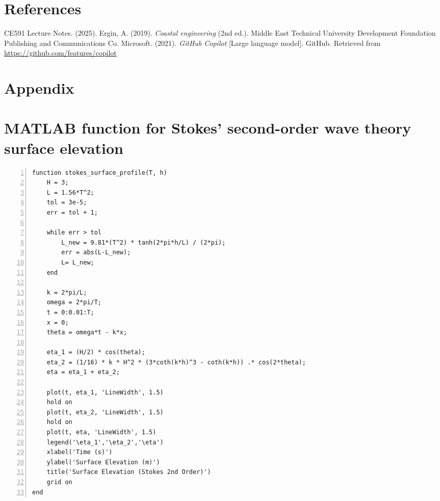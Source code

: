 \documentclass[a4paper]{article}
\begin{document}
\newpage
\renewcommand{\refname}{}
\section{References}
\vspace{-1cm}
\begin{thebibliography}{99}
     CE591 Lecture Notes. (2025). 
     Ergin, A. (2019). \textit{Coastal engineering} (2nd ed.). Middle East Technical University Development Foundation Publishing and Communications Co.
     Microsoft. (2021). \textit{GitHub Copilot} [Large language model]. GitHub. Retrieved from \url{https://github.com/features/copilot}
\end{thebibliography}

\newpage
\appendix

\section{Appendix}

\section*{\small MATLAB function for Stokes' second-order wave theory surface elevation}
\begin{lstlisting}[frame=single, numbers=left, style=Matlab-Pyglike]
function stokes_surface_profile(T, h)
    H = 3;
    L = 1.56*T^2; 
    tol = 3e-5;
    err = tol + 1;

    while err > tol
        L_new = 9.81*(T^2) * tanh(2*pi*h/L) / (2*pi);
        err = abs(L-L_new);
        L= L_new;
    end

    k = 2*pi/L;
    omega = 2*pi/T;
    t = 0:0.01:T;
    x = 0;
    theta = omega*t - k*x;

    eta_1 = (H/2) * cos(theta);
    eta_2 = (1/16) * k * H^2 * (3*coth(k*h)^3 - coth(k*h)) .* cos(2*theta);
    eta = eta_1 + eta_2;

    plot(t, eta_1, 'LineWidth', 1.5)
    hold on
    plot(t, eta_2, 'LineWidth', 1.5)
    hold on
    plot(t, eta, 'LineWidth', 1.5)
    legend('\eta_1','\eta_2','\eta')
    xlabel('Time (s)')
    ylabel('Surface Elevation (m)')
    title('Surface Elevation (Stokes 2nd Order)')
    grid on
end
\end{lstlisting}
\newpage
\end{document}
